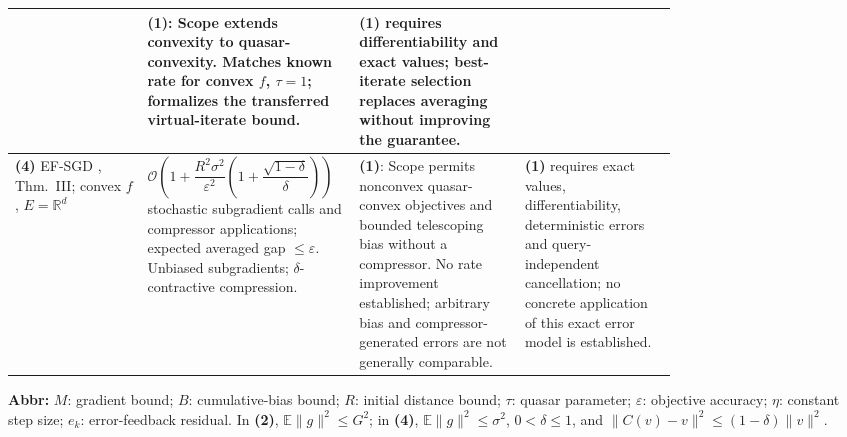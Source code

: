 \begin{table}[tp]
\begin{threeparttable}
\begin{tabularx}{\linewidth}{@{}>{\raggedright\arraybackslash}p{0.20\linewidth}>{\raggedright\arraybackslash}p{0.32\linewidth}>{\raggedright\arraybackslash}p{0.25\linewidth}>{\raggedright\arraybackslash}X@{}}
& \textbf{(1)}: Scope extends convexity to quasar-convexity. Matches known rate for convex $f$, $\tau=1$; formalizes the transferred virtual-iterate bound.
& \textbf{(1)} requires differentiability and exact values; best-iterate selection replaces averaging without improving the guarantee. \\
\midrule
\textbf{(4)} EF-SGD \citep{qsbKarimireddy2019}, Thm.~III; convex $f$, $E=\mathbb R^d$
& $\mathcal{O}\!\left(1+\dfrac{R^2\sigma^2}{\varepsilon^2}\left(1+\dfrac{\sqrt{1-\delta}}{\delta}\right)\right)$ stochastic subgradient calls and compressor applications; expected averaged gap $\le\varepsilon$. Unbiased subgradients; $\delta$-contractive compression.
& \textbf{(1)}: Scope permits nonconvex quasar-convex objectives and bounded telescoping bias without a compressor. No rate improvement established; arbitrary bias and compressor-generated errors are not generally comparable.
& \textbf{(1)} requires exact values, differentiability, deterministic errors and query-independent cancellation; no concrete application of this exact error model is established. \\
\bottomrule
\end{tabularx}
\begin{tablenotes}[flushleft]\footnotesize
\item[] \textbf{Abbr:} $M$: gradient bound; $B$: cumulative-bias bound; $R$: initial distance bound; $\tau$: quasar parameter; $\varepsilon$: objective accuracy; $\eta$: constant step size; $e_k$: error-feedback residual. In \textbf{(2)}, $\mathbb E\|g\|^2\le G^2$; in \textbf{(4)}, $\mathbb E\|g\|^2\le\sigma^2$, $0<\delta\le1$, and $\|C(v)-v\|^2\le(1-\delta)\|v\|^2$.
\end{tablenotes}
\end{threeparttable}
\end{table}
\clearpage
